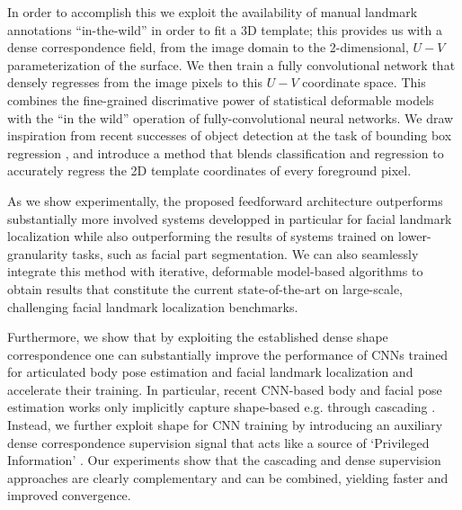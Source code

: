 In order to accomplish this 
    we exploit the availability of manual landmark annotations ``in-the-wild'' in order to fit a 3D template; this provides us with a dense correspondence field, from the image domain to the 2-dimensional, $U-V$ parameterization of the surface. We then train a fully convolutional network that densely regresses from the image pixels to this $U-V$ coordinate space. This combines the fine-grained discrimative power of statistical deformable models with the ``in the wild'' operation of fully-convolutional neural networks. 
    We draw inspiration from recent successes of object detection at the task of bounding box regression \cite{ren2015faster}, and 
    introduce a method that blends classification and regression to accurately regress the 2D template coordinates of every foreground pixel.
    
    As we show experimentally, the proposed  feedforward architecture outperforms substantially more involved systems developped in particular for facial landmark localization while also outperforming the results of systems trained on lower-granularity tasks, such as facial part segmentation.
We can also seamlessly integrate this method with iterative, deformable model-based algorithms to obtain results that constitute the current state-of-the-art on large-scale, challenging facial landmark localization benchmarks.



Furthermore, we show that by exploiting the established dense shape correspondence one can substantially improve the performance of CNNs trained for articulated body pose estimation and facial landmark localization and accelerate their training. 
In particular, recent CNN-based body and facial pose estimation works  only implicitly capture shape-based e.g. through cascading \cite{newell2016stacked}.  Instead, we further exploit shape for CNN  training by introducing an auxiliary dense correspondence supervision signal that acts like a source  of  `Privileged Information' \cite{VapnikV09,lopez2015unifying,ChenJFY17}.
Our experiments show that the cascading and dense supervision approaches are clearly complementary and can be combined, yielding faster and improved convergence. 



